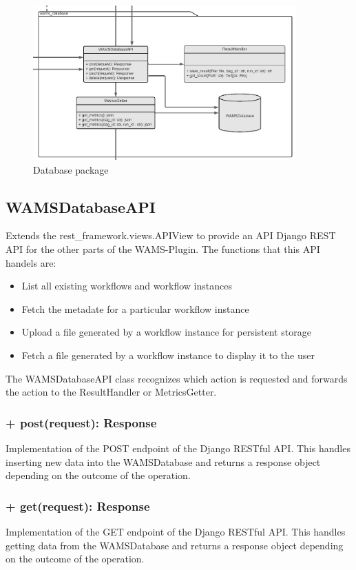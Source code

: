 \begin{figure} [ht]
    \centering
    \includegraphics[width=0.9\textwidth]{Diagramme/KlassendiagrammAusschnitte/Klassendiagramm -database.png}
    \caption{Database package}
    \label{fig:database section}
\end{figure}

\subsection{WAMSDatabaseAPI}
Extends the rest\_framework.views.APIView to provide an API Django REST API for the other
parts of the WAMS-Plugin. The functions that this API handels are:
\begin{itemize}
    \item List all existing workflows and workflow instances
    \item Fetch the metadate for a particular workflow instance
    \item Upload a file generated by a workflow instance for persistent storage
    \item Fetch a file generated by a workflow instance to display it to the user
\end{itemize}
The WAMSDatabaseAPI class recognizes which action is requested and forwards the action to
the ResultHandler or MetricsGetter.

\subsubsection{+ post(request): Response}
Implementation of the POST endpoint of the Django RESTful API. This handles inserting new data into the WAMSDatabase and returns a response object depending on the outcome of the operation.
\subsubsection{+ get(request): Response}
Implementation of the GET endpoint of the Django RESTful API. This handles getting data from the WAMSDatabase and returns a response object depending on the outcome of the operation.

